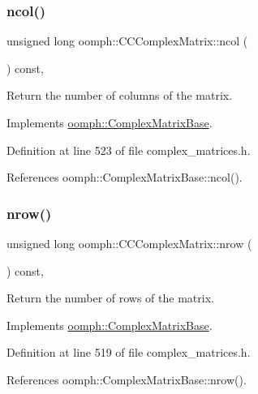 \subsubsection{\texorpdfstring{ncol()}{ncol()}}
{\footnotesize\ttfamily unsigned long oomph\+::\+C\+C\+Complex\+Matrix\+::ncol (\begin{DoxyParamCaption}{ }\end{DoxyParamCaption}) const\hspace{0.3cm}{\ttfamily [inline]}, {\ttfamily [virtual]}}



Return the number of columns of the matrix. 



Implements \hyperlink{classoomph_1_1ComplexMatrixBase_a849b63e50dad36ca8b20b7bdefd34b8d}{oomph\+::\+Complex\+Matrix\+Base}.



Definition at line 523 of file complex\+\_\+matrices.\+h.



References oomph\+::\+Complex\+Matrix\+Base\+::ncol().

\mbox{\label{classoomph_1_1CCComplexMatrix_a52c78210ebe95b72ead8d938f5c7a9bb}} 
\subsubsection{\texorpdfstring{nrow()}{nrow()}}
{\footnotesize\ttfamily unsigned long oomph\+::\+C\+C\+Complex\+Matrix\+::nrow (\begin{DoxyParamCaption}{ }\end{DoxyParamCaption}) const\hspace{0.3cm}{\ttfamily [inline]}, {\ttfamily [virtual]}}



Return the number of rows of the matrix. 



Implements \hyperlink{classoomph_1_1ComplexMatrixBase_adcbdf19bc82c61c0a4fbfd8c8de97b3b}{oomph\+::\+Complex\+Matrix\+Base}.



Definition at line 519 of file complex\+\_\+matrices.\+h.



References oomph\+::\+Complex\+Matrix\+Base\+::nrow().

